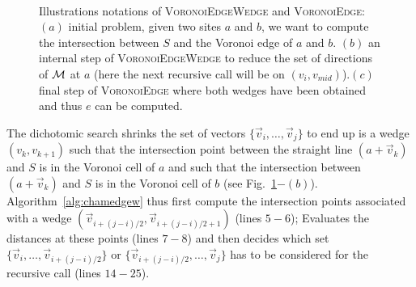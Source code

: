\documentclass{llncs}
\begin{document}
\begin{figure}[htbp]
  \begin{center}
    ~~~~~~~~~
    ~~~~~~~~~
  \end{center}
  \caption{Illustrations notations of \textsc{VoronoiEdgeWedge} and
    \textsc{VoronoiEdge}: $(a)$ initial problem, given two sites $a$
    and $b$, we want to compute the intersection between $S$ and the
    Voronoi edge of $a$ and $b$. $(b)$ an internal step of
    \textsc{VoronoiEdgeWedge} to reduce the set of directions of $\mathcal{M}$
    at $a$ (here the next recursive call will be on
    $(v_i,v_{mid})$).$(c)$ final step of \textsc{VoronoiEdge} where
    both wedges have been obtained and thus $e$ can be computed.}
  \label{fig:algo}
\end{figure}

The dichotomic search shrinks the set of vectors
$\{\vec{v}_i,\ldots,\vec{v}_j\}$ to end up is a wedge $(v_k,v_{k+1})$
such that the intersection point between the straight line $(a +
\vec{v}_k)$ and $S$ is in the Voronoi cell of $a$ and such that the
intersection between $(a + \vec{v}_k)$ and $S$ is in the Voronoi cell
of $b$ (see Fig.~\ref{fig:algo}$-(b)$). Algorithm~\ref{alg:chamedgew} thus first compute the
intersection points associated with a wedge $(\vec{v}_{i+(j-i)/2},
\vec{v}_{i+(j-i)/2+1})$ (lines $5-6$); Evaluates the distances at
these points (lines $7-8$) and then decides which set
$\{\vec{v}_i,\ldots,\vec{v}_{i+(j-i)/2}\}$ or
$\{\vec{v}_{i+(j-i)/2},\ldots,\vec{v}_j\}$ has to be considered for
the recursive call (lines $14-25$).
\end{document}
